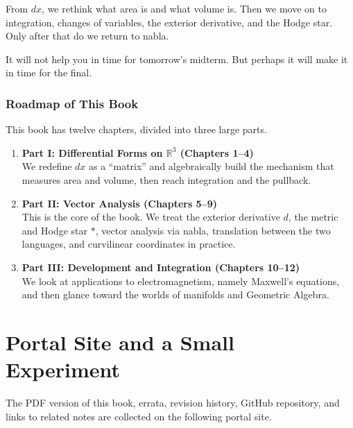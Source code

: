 \documentclass[a4paper,12pt,openany]{book}
\providecommand{\tightlist}{%
  \setlength{\itemsep}{0pt}\setlength{\parskip}{0pt}}
\begin{document}
From \(dx\), we rethink what area is and what volume is. Then we move on
to integration, changes of variables, the exterior derivative, and the
Hodge star. Only after that do we return to nabla.

It will not help you in time for tomorrow's midterm. But perhaps it will
make it in time for the final.

\par\vspace{0.35em}\par

\hypertarget{roadmap-of-this-book}{%
\subsection{Roadmap of This Book}\label{roadmap-of-this-book}}

This book has twelve chapters, divided into three large parts.

\begin{enumerate}
\def\labelenumi{\arabic{enumi}.}
\tightlist
\item
  \textbf{Part I: Differential Forms on $\mathbb{R}^3$ (Chapters 1–4)}\\
  We redefine \(dx\) as a ``matrix'' and algebraically build the
  mechanism that measures area and volume, then reach integration and
  the pullback.
\item
  \textbf{Part II: Vector Analysis (Chapters 5–9)}\\
  This is the core of the book. We treat the exterior derivative \(d\),
  the metric and Hodge star \(\ast\), vector analysis via nabla,
  translation between the two languages, and curvilinear coordinates in
  practice.
\item
  \textbf{Part III: Development and Integration (Chapters 10–12)}\\
  We look at applications to electromagnetism, namely Maxwell's
  equations, and then glance toward the worlds of manifolds and
  Geometric Algebra.
\end{enumerate}

\newpage

\hypertarget{portal-site-and-a-small-experiment}{%
\chapter{Portal Site and a Small
Experiment}\label{portal-site-and-a-small-experiment}}

The PDF version of this book, errata, revision history, GitHub
repository, and links to related notes are collected on the following
portal site.
\end{document}
